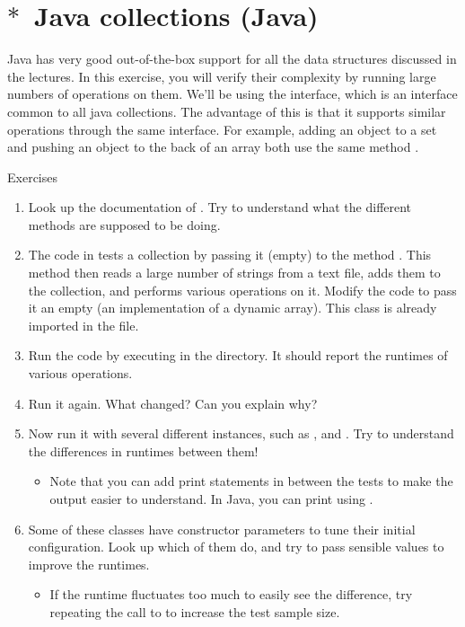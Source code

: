\section{$\ast$~Java collections (Java)}

Java has very good out-of-the-box support for all the data structures discussed in the lectures. In this exercise, you will verify their complexity by running large numbers of operations on them. We'll be using the  interface, which is an interface common to all java collections. The advantage of this is that it supports similar operations through the same interface. For example, adding an object to a set and pushing an object to the back of an array both use the same method .
%
\begin{mybox}{Exercises}
    \begin{enumerate}
        \item Look up the documentation of . Try to understand what the different methods are supposed to be doing.
        \item The code in  tests a collection by passing it (empty) to the method . This method then reads a large number of strings from a text file, adds them to the collection, and performs various operations on it. Modify the code to pass it an empty  (an implementation of a dynamic array). This class is already imported in the file.
        \item Run the code by executing  in the  directory. It should report the runtimes of various operations.
        \item Run it again. What changed? Can you explain why?
        \item Now run it with several different  instances, such as ,  and . Try to understand the differences in runtimes between them!
            \begin{itemize}
                \item Note that you can add print statements in between the tests to make the output easier to understand. In Java, you can print using .
            \end{itemize}
        \item Some of these classes have constructor parameters to tune their initial configuration. Look up which of them do, and try to pass sensible values to improve the runtimes.
            \begin{itemize}
                \item If the runtime fluctuates too much to easily see the difference, try repeating the call to  to increase the test sample size.
            \end{itemize}
    \end{enumerate}
\end{mybox}

